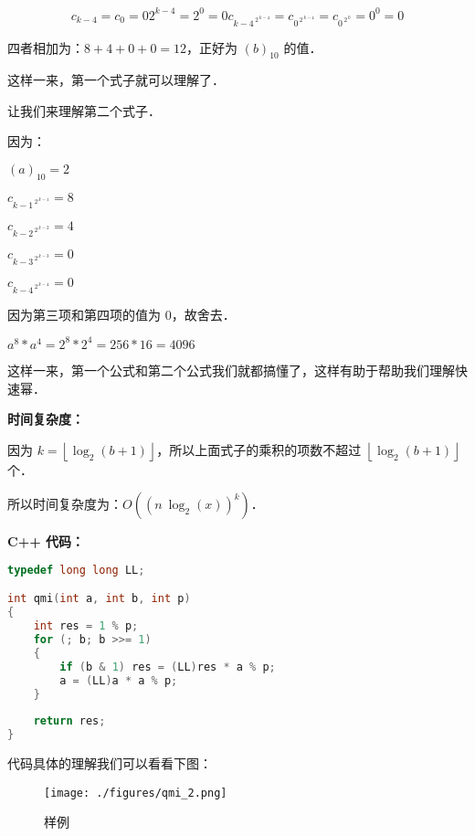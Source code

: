$$
c_{k - 4} = c_0 = 0
2 ^ {k - 4} = 2 ^ 0 = 0
c_{{k-4}^{\ 2^{\ k-4}}} = c_{{0}^{\ 2^{\ k-4}}} = c_{{0}^{\ 2^{\ 0}}} = 0^0 = 0
$$


四者相加为：$8 + 4 + 0 + 0 = 12$，正好为 $(b) _ {10}$ 的值．

这样一来，第一个式子就可以理解了．

让我们来理解第二个式子．

因为：

$(a)_{10} = 2$

$c_{{k-1}^{\ 2^{\ k-1}}} = 8$

$c_{{k-2}^{\ 2^{\ k-2}}} = 4$

$c_{{k-3}^{\ 2^{\ k-3}}} = 0$

$c_{{k-4}^{\ 2^{\ k-4}}} = 0$

因为第三项和第四项的值为 $0$，故舍去． 

$a ^ 8 * a ^ 4 = 2 ^ 8 * 2 ^ 4 = 256 * 16 = 4096$

这样一来，第一个公式和第二个公式我们就都搞懂了，这样有助于帮助我们理解快速幂．

\textbf{时间复杂度：}

因为 $k=\left\lfloor{\log_2(b+1)}\right\rfloor$，所以上面式子的乘积的项数不超过 $\left\lfloor{\log_2(b+1)}\right\rfloor$ 个．

所以时间复杂度为：$O((n\ \log_2(x))^k)$．

\textbf{C++ 代码：}

\begin{lstlisting}[language=cpp]
typedef long long LL;

int qmi(int a, int b, int p)
{
    int res = 1 % p;
    for (; b; b >>= 1)
    {
        if (b & 1) res = (LL)res * a % p;
        a = (LL)a * a % p;
    }
    
    return res;
}
\end{lstlisting}

代码具体的理解我们可以看看下图：
\begin{figure}[ht]
\centering
\texttt{[image: ./figures/qmi\_2.png]}
\caption{样例} \label{qmi_fig2}
\end{figure}
